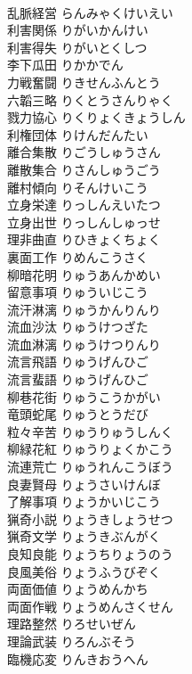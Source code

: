 \documentclass[8pt]{extreport}
\begin{document}
\begin{CJK}{UTF8}{min}
\\	乱脈経営	らんみゃくけいえい	
\\	利害関係	りがいかんけい	
\\	利害得失	りがいとくしつ	
\\	李下瓜田	りかかでん	
\\	力戦奮闘	りきせんふんとう	
\\	六韜三略	りくとうさんりゃく	
\\	戮力協心	りくりょくきょうしん	
\\	利権団体	りけんだんたい	
\\	離合集散	りごうしゅうさん	
\\	離散集合	りさんしゅうごう	
\\	離村傾向	りそんけいこう	
\\	立身栄達	りっしんえいたつ	
\\	立身出世	りっしんしゅっせ	
\\	理非曲直	りひきょくちょく	
\\	裏面工作	りめんこうさく	
\\	柳暗花明	りゅうあんかめい	
\\	留意事項	りゅういじこう	
\\	流汗淋漓	りゅうかんりんり	
\\	流血沙汰	りゅうけつざた	
\\	流血淋漓	りゅうけつりんり	
\\	流言飛語	りゅうげんひご	
\\	流言蜚語	りゅうげんひご	
\\	柳巷花街	りゅうこうかがい	
\\	竜頭蛇尾	りゅうとうだび	
\\	粒々辛苦	りゅうりゅうしんく	
\\	柳緑花紅	りゅうりょくかこう	
\\	流連荒亡	りゅうれんこうぼう	
\\	良妻賢母	りょうさいけんぼ	
\\	了解事項	りょうかいじこう	
\\	猟奇小説	りょうきしょうせつ	
\\	猟奇文学	りょうきぶんがく	
\\	良知良能	りょうちりょうのう	
\\	良風美俗	りょうふうびぞく	
\\	両面価値	りょうめんかち	
\\	両面作戦	りょうめんさくせん	
\\	理路整然	りろせいぜん	
\\	理論武装	りろんぶそう	
\\	臨機応変	りんきおうへん	

\end{CJK}
\end{document}
